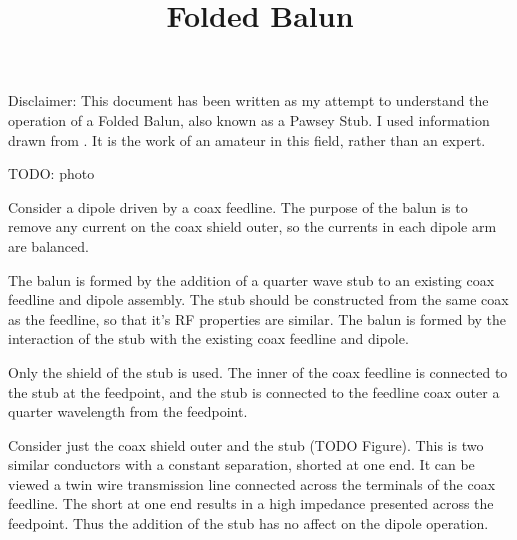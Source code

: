 \documentclass{article}
\begin{document}
\title{Folded Balun}
\maketitle

Disclaimer: This document has been written as my attempt to understand the operation of a Folded Balun, also known as a Pawsey Stub.  I used information drawn from \cite{stack_exchange}\cite{antenna_theory}\cite{duffey}.  It is the work of an amateur in this field, rather than an expert.

TODO: photo

\begin{center}
\end{center}

Consider a dipole driven by a coax feedline.  The purpose of the balun is to remove any current on the coax shield outer, so the currents in each dipole arm are balanced.

The balun is formed by the addition of a quarter wave stub to an existing coax feedline and dipole assembly.  The stub should be constructed from the same coax as the feedline, so that it's RF properties are similar.  The balun is formed by the interaction of the stub with the existing coax feedline and dipole.

Only the shield of the stub is used.  The inner of the coax feedline is connected to the stub at the feedpoint, and the stub is connected to the feedline coax outer a quarter wavelength from the feedpoint.

Consider just the coax shield outer and the stub (TODO Figure).  This is two similar conductors with a constant separation, shorted at one end.  It can be viewed a twin wire transmission line connected across the terminals of the coax feedline.  The short at one end results in a high impedance presented across the feedpoint. Thus the addition of the stub has no affect on the dipole operation.
\end{document}
